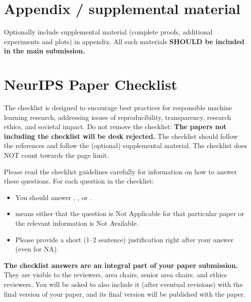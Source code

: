 \documentclass{article}
\begin{document}



\appendix

\section{Appendix / supplemental material}


Optionally include supplemental material (complete proofs, additional experiments and plots) in appendix.
All such materials \textbf{SHOULD be included in the main submission.}


\newpage
\section*{NeurIPS Paper Checklist}

The checklist is designed to encourage best practices for responsible machine learning research, addressing issues of reproducibility, transparency, research ethics, and societal impact. Do not remove the checklist: {\bf The papers not including the checklist will be desk rejected.} The checklist should follow the references and follow the (optional) supplemental material.  The checklist does NOT count towards the page
limit. 

Please read the checklist guidelines carefully for information on how to answer these questions. For each question in the checklist:
\begin{itemize}
    \item You should answer \answerYes{}, \answerNo{}, or \answerNA{}.
    \item \answerNA{} means either that the question is Not Applicable for that particular paper or the relevant information is Not Available.
    \item Please provide a short (1–2 sentence) justification right after your answer (even for NA). 
\end{itemize}

{\bf The checklist answers are an integral part of your paper submission.} They are visible to the reviewers, area chairs, senior area chairs, and ethics reviewers. You will be asked to also include it (after eventual revisions) with the final version of your paper, and its final version will be published with the paper.
\end{document}
